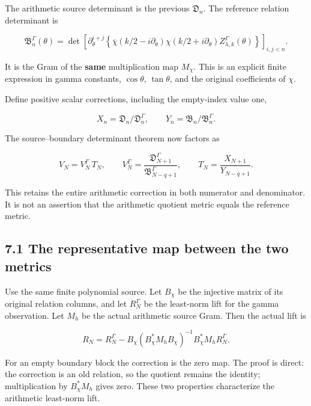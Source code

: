 \documentclass[
  11pt,
]{article}
\begin{document}
The arithmetic source determinant is the previous \(\mathfrak D_n\). The
reference relation determinant is

\[
\mathfrak B_n^\Gamma(\theta)
=\det\left[\partial_\theta^{i+j}
 \left\{\overline\chi(k/2-i\partial_\theta)
       \chi(k/2+i\partial_\theta)
       Z_{\lambda,k}^\Gamma(\theta)\right\}\right]_{i,j<n}.         \tag{30}
\]

It is the Gram of the \textbf{same} multiplication map \(M_\chi\). This
is an explicit finite expression in gamma constants, \(\cos\theta\),
\(\tan\theta\), and the original coefficients of \(\chi\).

Define positive scalar corrections, including the empty-index value one,

\[
X_n=\mathfrak D_n/\mathfrak D_n^\Gamma,\qquad
Y_n=\mathfrak B_n/\mathfrak B_n^\Gamma.
\]

The source--boundary determinant theorem now factors as

\[
\boxed{
V_N=V_N^\Gamma\,T_N,\qquad
 V_N^\Gamma=\frac{\mathfrak D_{N+1}^\Gamma}{\mathfrak B_{N-q+1}^\Gamma},\qquad
 T_N=\frac{X_{N+1}}{Y_{N-q+1}}.
}                                                                   \tag{31}
\]

This retains the entire arithmetic correction in both numerator and
denominator. It is not an assertion that the arithmetic quotient metric
equals the reference metric.

\subsection{7.1 The representative map between the two
metrics}\label{the-representative-map-between-the-two-metrics}

Use the same finite polynomial source. Let \(B_\chi\) be the injective
matrix of its original relation columns, and let \(R_N^\Gamma\) be the
least-norm lift for the gamma observation. Let \(M_h\) be the actual
arithmetic source Gram. Then the actual lift is

\[
\boxed{
R_N=R_N^\Gamma-
B_\chi(B_\chi^*M_hB_\chi)^{-1}B_\chi^*M_hR_N^\Gamma.
}                                                                   \tag{32}
\]

For an empty boundary block the correction is the zero map. The proof is
direct: the correction is an old relation, so the quotient remains the
identity; multiplication by \(B_\chi^*M_h\) gives zero. These two
properties characterize the arithmetic least-norm lift.
\end{document}
